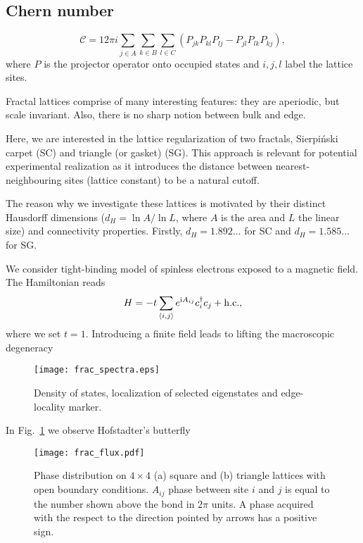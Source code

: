 \subsection*{Chern number}


\begin{equation}
\mathcal{C} = 12 \pi i \sum_{j \in A} \sum_{k \in B} \sum_{l \in C} \left( P_{jk} P_{kl} P_{lj} - P_{jl} P_{lk} P_{kj} \right),
\label{eq: chern_real}
\end{equation}
where $P$ is the projector operator onto occupied states and $i, j, l$ label the lattice sites.

Fractal lattices comprise of many interesting features: they are aperiodic, but scale invariant. Also, there is no sharp notion between bulk and edge.

Here, we are interested in the lattice regularization of two fractals, Sierpiński carpet (SC) and triangle (or gasket) (SG). This approach is relevant for potential experimental realization as it introduces the distance between nearest-neighbouring sites (lattice constant) to be a natural cutoff.

The reason why we investigate these lattices is motivated by their distinct Hausdorff dimensions ($d_H = \ln A / \ln L$, where $A$ is the area and $L$ the linear size) and connectivity properties. Firstly, $d_H = 1.892 \ldots$ for SC and $d_H = 1.585 \ldots$ for SG. 



We consider tight-binding model of spinless electrons exposed to a magnetic field. The Hamiltonian reads
\begin{equation}
H = -t  \sum_{\langle i, j \rangle} e^{\textnormal{i} A_{ij}} c^{\dagger}_i c_j + \mathrm{h.c.},
\label{eq:frac_ham}
\end{equation}
where we set $t = 1$. Introducing a finite field leads to lifting the macroscopic degeneracy

\begin{figure}
\centering
\texttt{[image: frac\_spectra.eps]} 
\caption{Density of states, localization of selected eigenstates and edge-locality marker.}
\label{fig:frac_spect}
\end{figure}

In Fig.~\ref{fig:frac_spect} we observe Hofstadter's butterfly~\cite{1976:Hofstadter}

\begin{figure}
\centering
\texttt{[image: frac\_flux.pdf]} 
\caption{Phase distribution on $4 \times 4$ (a) square and (b) triangle lattices with open boundary conditions. $A_{ij}$ phase between site $i$ and $j$ is equal to the number shown above the bond in $2 \pi$ units. A phase acquired with the respect to the direction pointed by arrows has a positive sign.}
\label{fig:flux_distr}
\end{figure}


